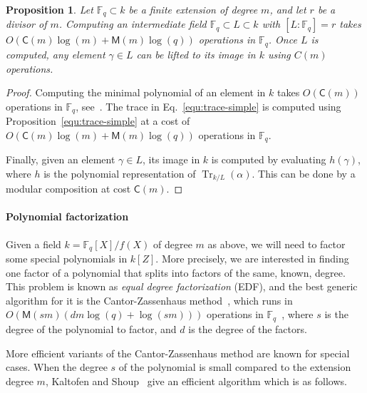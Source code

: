 \documentclass[12pt]{article}
\theoremstyle{plain}
\newtheorem{proposition}[theorem]{Proposition}
\theoremstyle{definition}
\DeclareMathOperator{\trace}{Tr} %
\def\F{\ensuremath{\mathbb{F}}}
\def\MM{\ensuremath{\mathsf{M}}}
\def\CC{\ensuremath{\mathsf{C}}}
\newcounter{algorithm}
\begin{document}
\begin{proposition}
	\label{prop:subfield}
	Let $\F_q \subset k$ be a finite extension of degree $m$, and
        let $r$ be a divisor of $m$.  Computing an intermediate field
        $\F_q \subset L \subset k$ with $[L:\F_q]=r$ takes
        $O(\CC(m)\log(m) + \MM(m)\log(q))$ operations in $\F_q$.  Once
        $L$ is computed, any element $\gamma\in L$ can be lifted to
        its image in $k$ using $C(m)$ operations.
\end{proposition}
\begin{proof}
	Computing the minimal polynomial of an element in $k$ takes $O(\CC(m))$ operations in $\F_q$, 
	see~\cite{shoup93}. %
        The trace in Eq.~\eqref{equ:trace-simple} is computed using Proposition~\ref{equ:trace-simple}
        at a cost of $O(\CC(m)\log(m)+\MM(m)\log(q))$ operations in $\F_q$.

        Finally, given an element $\gamma\in L$, its image in $k$ is
        computed by evaluating $h(\gamma)$, where $h$ is the
        polynomial representation of $\trace_{k/L}(\alpha)$. This can
        be done by a modular composition at cost $\CC(m)$.
\end{proof}


\paragraph{Polynomial factorization}
Given a field $k = \F_q[X]/f(X)$ of degree $m$ as above, we will need to
factor some special polynomials in $k[Z]$. More precisely, we are
interested in finding one factor of a polynomial that splits into
factors of the same, known, degree. This problem is known as
\emph{equal degree factorization} (EDF), and the best generic algorithm for
it is the Cantor-Zassenhaus method~\cite{cantor1981,von1992computing},
which runs in $O(\MM(sm)(dm\log(q) + \log(sm)))$ operations in
$\F_q$~\cite[Th.~14.9]{vzGG}, where $s$ is the degree of the
polynomial to factor, and $d$ is the degree of the factors.

More efficient variants of the Cantor-Zassenhaus method are known for
special cases. When the degree $s$ of the polynomial is small compared
to the extension degree $m$, Kaltofen and Shoup~\cite{kaltofen+shoup97} 
give an efficient algorithm which is as follows.
\end{document}
